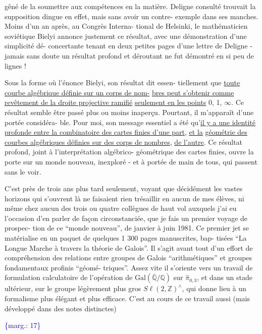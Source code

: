 \documentclass[11pt]{article}
\newcommand{\scanpage}[1]{\par\bigskip\noindent{\small\sffamily[scan #1]}\par}
\newcommand{\mspage}[1]{{\small\sffamily[p.\,#1]}}
\newcommand{\margin}[1]{\textcolor{blue}{\{\textsf{marg.:} #1\}}}
\newcommand{\uline}[1]{\underline{#1}}
\begin{document}
gêné de la soumettre aux compétences en la matière. Deligne consulté
trouvait la supposition dingue en effet, mais sans avoir un contre-%
exemple dans ses manches. Moins d'un an après, au Congrès Interna-%
tional de Helsinki, le mathématicien soviétique Bielyi annonce
justement ce résultat, avec une démonstration d'une simplicité dé-%
concertante tenant en deux petites pages d'une lettre de Deligne -
jamais sans doute un résultat profond et déroutant ne fut démontré
en si peu de lignes !

Sous la forme où l'énonce Bielyi, son résultat dit essen-%
tiellement que \uline{toute courbe algébrique définie sur un corps de nom-}%
\uline{bres peut s'obtenir comme revêtement de la droite projective ramifié}
\uline{seulement en les points} 0, 1, $\infty$. Ce résultat semble être passé plus
ou moins inaperçu. Pourtant, il m'apparaît d'une portée considéra-%
ble. Pour moi, son message essentiel a été qu'\uline{il y a une identité}
\uline{profonde entre la combinatoire des cartes finies d'une part}, \uline{et la}
\uline{géométrie des courbes algébriques définies sur des corps de nombres},
\uline{de l'autre}. Ce résultat profond, joint à l'interprétation algébrico-%
géométrique des cartes finies, ouvre la porte sur un monde nouveau,
inexploré - et à portée de main de tous, qui passent sans le voir.

C'est près de trois ans plus tard seulement, voyant que
décidément les vastes horizons qui s'ouvrent là ne faisaient rien
trésaillir en aucun de mes élèves, ni même chez aucun des trois ou
quatre collègues de haut vol auxquels j'ai eu l'occasion d'en parler
de façon circonstanciée, que je fais un premier voyage de prospec-%
tion de ce ``monde nouveau'', de janvier à juin 1981. Ce premier jet se
matérialise en un paquet de quelques 1 300 pages manuscrites, bap-%
tisées ``La Longue Marche à travers la théorie de Galois''. Il s'agit
avant tout d'un effort de compréhension des relations entre groupes
de Galois ``arithmétiques'' et groupes fondamentaux profinis ``géomé-%
triques''. Assez vite il s'oriente vers un travail de formulation
calculatoire de l'opération de $\mathrm{Gal}(\bar{\mathbb{Q}}/\mathbb{Q})$ sur $\hat{\pi}_{0,3}$, et dans un
stade ultérieur, sur le groupe légèrement plus gros $S\ell(2,\mathbb{Z})^{\wedge}$, qui
donne lieu à un formalisme plus élégant et plus efficace. C'est au
cours de ce travail aussi (mais développé dans des notes distinctes)

\margin{17}

\clearpage
\scanpage{119/18}
\mspage{16}
\end{document}
